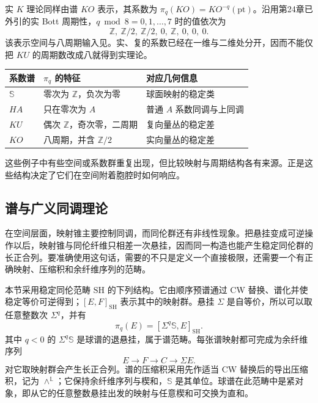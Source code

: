 \ProseParagraphBreak

实 \(K\) 理论同样由谱 \(KO\) 表示，其系数为 \(\pi_q(KO)=KO^{-q}(\mathrm{pt})\)。沿用第24章已外引的实 Bott 周期性，\(q\bmod8=0,1,\ldots,7\) 时的值依次为
\[
	\mathbb Z,\ \mathbb Z/2,\ \mathbb Z/2,\ 0,\ \mathbb Z,\ 0,\ 0,\ 0.
\]
该表示空间与八周期输入见\cite[第II章第3节；第IV章第3节]{Weibel2013KBook}。实、复的系数已经在一维与二维处分开，因而不能仅把 \(KU\) 的周期数改成八就得到实理论。

\begin{center}
	\begin{tabular}{@{}l l l@{}}
		\toprule
		系数谱 & \(\pi_q\) 的特征 & 对应几何信息 \\
		\midrule
		\(\mathbb S\) & 零次为 \(\mathbb Z\)，负次为零 & 球面映射的稳定类 \\
		\(HA\) & 只在零次为 \(A\) & 普通 \(A\) 系数同调与上同调 \\
		\(KU\) & 偶次 \(\mathbb Z\)，奇次零，二周期 & 复向量丛的稳定差 \\
		\(KO\) & 八周期，并含 \(\mathbb Z/2\) & 实向量丛的稳定差 \\
		\bottomrule
	\end{tabular}
\end{center}

这些例子中有些空间或系数群重复出现，但比较映射与周期结构各有来源。正是这些结构决定了它们在空间附着胞腔时如何响应。

\subsection{谱与广义同调理论}
\label{g2:subsec:C02:03}

在空间层面，映射锥主要控制同调，而同伦群还有非线性现象。把悬挂变成可逆操作以后，映射锥与同伦纤维只相差一次悬挂，因而同一构造也能产生稳定同伦群的长正合列。要准确使用这句话，需要的不只是定义一个直接极限，还需要一个有正确映射、压缩积和余纤维序列的范畴。

\ProseParagraphBreak

本节采用稳定同伦范畴 \(\mathrm{SH}\) 的下列结构。它由顺序预谱通过 CW 替换、谱化并使稳定等价可逆得到；\([E,F]_{\mathrm{SH}}\) 表示其中的映射群。悬挂 \(\Sigma\) 是自等价，所以可以取任意整数次 \(\Sigma^q\)，并有
\[
	\pi_q(E)=[\Sigma^q\mathbb S,E]_{\mathrm{SH}}.
\]
其中 \(q<0\) 的 \(\Sigma^q\mathbb S\) 是球谱的退悬挂，属于谱范畴。每张谱映射都可完成为余纤维序列
\[
	E\longrightarrow F\longrightarrow C\longrightarrow\Sigma E.
\]
对它取映射群会产生长正合列。谱的压缩积采用先作适当 CW 替换后的导出压缩积，记为 \(\wedge^{\mathbb L}\)；它保持余纤维序列与楔和，\(\mathbb S\) 是其单位。球谱在此范畴中是紧对象，即从它的任意整数悬挂出发的映射与任意楔和可交换为直和。

